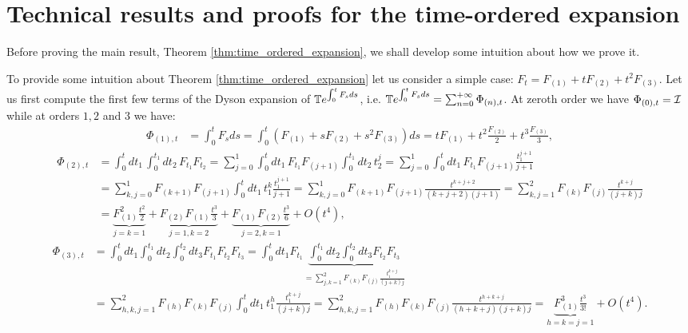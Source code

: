 
\section{Technical results and proofs for the time-ordered expansion}
\label{sec:thechnical_results:time_ordered}
Before proving the main result, Theorem \ref{thm:time_ordered_expansion}, we shall develop some intuition about how we prove it.
\begin{example}
To provide some intuition about Theorem \ref{thm:time_ordered_expansion} let us consider a simple case: \(F_t = F_{(1)} + t F_{(2)} +t^2 F_{(3)}\). 
Let us first compute the first few terms of the Dyson expansion \cite{Dyson} of $\mathbb{T} e^{\int_0^t F_s ds}$, i.e. $\mathbb{T} e^{\int_0^t F_s ds} = \sum_{n=0}^{+\infty} \Phi_{(n),t}$.
At zeroth order we have $\Phi_{(0),t} = \mathcal{I}$ while at orders $1,2$ and $3$ we have:
\begin{align*}
    \Phi_{(1),t} &= \int_0^t F_{s} ds = \int_0^t (F_{(1)} + sF_{(2)} + s^{2} F_{(3)}) ds = 
    t F_{(1)} + t^2\frac{F_{(2)}}{2} + t^3 \frac{F_{(3)}}{3} ,
\end{align*}
\begin{align*}
    \Phi_{(2),t} &= \int_0^t dt_1\, \int_0^{t_1} dt_2\, F_{t_1} F_{t_2} 
    = \sum_{j=0}^{1} \int_0^t dt_1\, F_{t_1} F_{(j+1)} \int_0^{t_1} dt_2\,  t_2^j 
    = \sum_{j=0}^{1} \int_0^t dt_1\, F_{t_1}F_{(j+1)}  \frac{t_1^{j+1}}{j+1}\\
    & = \sum_{k,j=0}^{1} F_{(k+1)}F_{(j+1)} \int_0^t dt_1\, t_1^k \frac{t_1^{j+1}}{j+1} = \sum_{k,j=0}^{1} F_{(k+1)}F_{(j+1)} \frac{t^{k+j+2}}{(k+j+2)(j+1)} = \sum_{k,j=1}^{2} F_{(k)}F_{(j)} \frac{t^{k+j}}{(j+k)j}\\
    &= \underbrace{F_{(1)}^2 \frac{t^2}{2}}_{j=k=1}
    + \underbrace{F_{(2)}F_{(1)}\frac{t^3}{3}}_{j=1,k=2} 
    + \underbrace{F_{(1)}F_{(2)}\frac{t^3}{6}}_{j=2,k=1} 
    + O(t^4),
\end{align*}
\begin{align*}
    \Phi_{(3),t} &= \int_0^t dt_1 \int_0^{t_1} dt_2 \int_0^{t_2} dt_3 F_{t_1} F_{t_2} F_{t_3} = \int_0^t dt_1 F_{t_1} \underbrace{\int_0^{t_1} dt_2 \int_0^{t_2} dt_3  F_{t_2} F_{t_3}}_{= \sum_{j,k=1}^{2} F_{(k)}F_{(j)} \frac{t_1^{k+j}}{(j+k)j}}\\ 
    &= \sum_{h,k,j=1}^{2} F_{(h)}F_{(k)}F_{(j)} \int_0^t dt_1\, t_1^h \frac{t_1^{k+j}}{(j+k)j} = \sum_{h,k,j=1}^{2} F_{(h)}F_{(k)}F_{(j)}  \frac{t^{h+k+j}}{(h+k+j)(j+k)j} 
     = \underbrace{F_{(1)}^3 \frac{t^{3}}{3!}}_{h=k=j=1} + O(t^4).
\end{align*}

\end{example}
